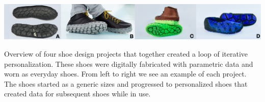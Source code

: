 \documentclass[sigconf]{acmart}
\begin{document}

\begin{teaserfigure}
\centering
\includegraphics[width=6.0in]{Header}
\caption{Overview of four shoe design projects that together created a loop of iterative personalization. These shoes were digitally fabricated with parametric data and worn as everyday shoes. From left to right we see an example of each project. The shoes started as a generic sizes and progressed to personalized shoes that created data for subsequent shoes while in use.}
\end{teaserfigure}

\maketitle




\balance

\end{document}
